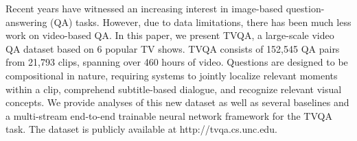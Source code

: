 Recent years have witnessed an increasing interest in image-based question-answering (QA) tasks. However, due to data limitations, there has been much less work on video-based QA. In this paper, we present TVQA, a large-scale video QA dataset based on 6 popular TV shows. TVQA consists of 152,545 QA pairs from 21,793 clips, spanning over 460 hours of video. Questions are designed to be compositional in nature, requiring systems to jointly localize relevant moments within a clip, comprehend subtitle-based dialogue, and recognize relevant visual concepts. We provide analyses of this new dataset as well as several baselines and a multi-stream end-to-end trainable neural network framework for the TVQA task. The dataset is publicly available at http://tvqa.cs.unc.edu.

